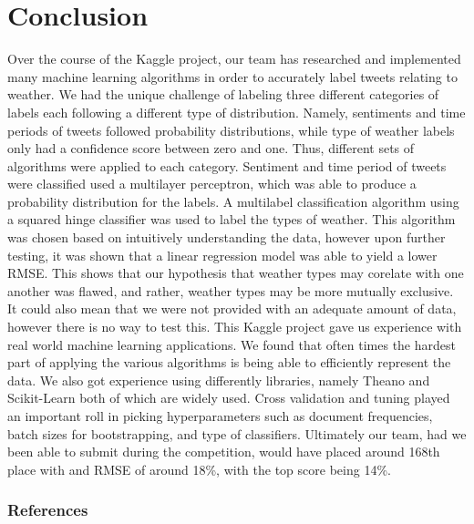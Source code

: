 \documentclass{article}
\begin{document}
\section{Conclusion}
Over the course of the Kaggle project, our team has researched and implemented many machine learning algorithms in order to accurately label tweets relating to weather. We had the unique challenge of labeling three different categories of labels each following a different type of distribution. Namely, sentiments and time periods of tweets followed probability distributions, while type of weather labels only had a confidence score between zero and one. Thus, different sets of algorithms were applied to each category. Sentiment and time period of tweets were classified used a multilayer perceptron, which was able to produce a probability distribution for the labels. A multilabel classification algorithm using a squared hinge classifier was used to label the types of weather. This algorithm was chosen based on intuitively understanding the data, however upon further testing, it was shown that a linear regression model was able to yield a lower RMSE. This shows that our hypothesis that weather types may corelate with one another was flawed, and rather, weather types may be more mutually exclusive. It could also mean that we were not provided with an adequate amount of data, however there is no way to test this. This Kaggle project gave us experience with real world machine learning applications. We found that often times the hardest part of applying the various algorithms is being able to efficiently represent the data. We also got experience using differently libraries, namely Theano and Scikit-Learn both of which are widely used. Cross validation and tuning played an important roll in picking hyperparameters such as document frequencies, batch sizes for bootstrapping, and type of classifiers. Ultimately our team, had we been able to submit during the competition, would have placed around 168th place with and RMSE of around 18\%, with the top score being 14\%.

\subsubsection*{References}
\end{document}
